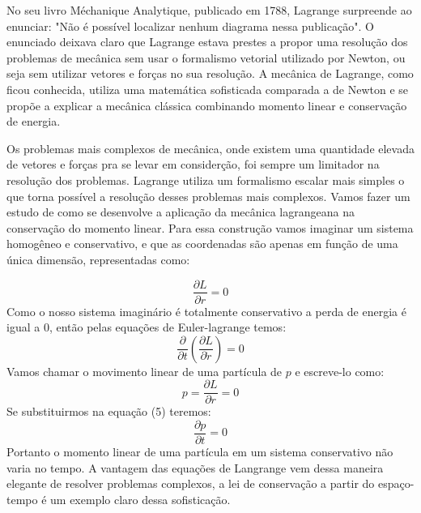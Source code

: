 \documentclass{article}
\begin{document}
No seu livro Méchanique Analytique, publicado em 1788, Lagrange surpreende ao enunciar: "Não é possível localizar nenhum diagrama nessa publicação". O enunciado deixava claro que Lagrange estava prestes a propor uma resolução dos problemas de mecânica sem usar o formalismo vetorial utilizado por Newton, ou seja sem utilizar vetores e forças no sua resolução. A mecânica de Lagrange, como ficou conhecida, utiliza uma matemática sofisticada comparada a de Newton e se propõe a explicar a mecânica clássica combinando momento linear e conservação de energia.

Os problemas mais complexos de mecânica, onde existem uma quantidade elevada de vetores e forças pra se levar em considerção, foi sempre um limitador na resolução dos problemas. Lagrange utiliza um formalismo escalar mais simples o que torna possível a resolução desses problemas mais complexos. Vamos fazer um estudo de como se desenvolve a aplicação da mecânica lagrangeana na conservação do momento linear. Para essa construção vamos imaginar um sistema homogêneo e conservativo, e que as coordenadas são apenas em função de uma única dimensão, representadas como:

 \begin{equation}
    \frac{\partial L}{\partial r}=0
\end{equation}
Como o nosso sistema imaginário é totalmente conservativo a perda de energia é igual a 0, então pelas equações de Euler-lagrange temos:
 \begin{equation}
    \frac{\partial}{\partial t} (\frac{\partial L}{\partial \dot{r}})=0
\end{equation}
Vamos chamar o movimento linear de uma partícula de $p$ e escreve-lo como:
 \begin{equation}
    {p} = \frac{\partial L}{\partial r}=0
\end{equation}
Se substituirmos na equação (5) teremos:
 \begin{equation}
    \frac{\partial p}{\partial t}=0
\end{equation}
Portanto o momento linear de uma partícula em um sistema conservativo não varia no tempo. A vantagem das equações de Langrange vem dessa maneira elegante de resolver problemas complexos, a lei de conservação a partir do espaço-tempo é um exemplo claro dessa sofisticação.
\end{document}
